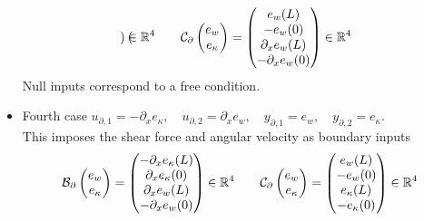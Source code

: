 \begin{itemize}
\begin{equation}
\begin{pmatrix}
	\end{pmatrix} \in \mathbb{R}^4 \qquad 
	\mathcal{C}_\partial \begin{pmatrix}
	e_w \\ e_\kappa \\ 
	\end{pmatrix} = \begin{pmatrix}
	e_w(L) \\ -e_w(0) \\  \partial_x e_w(L) \\ -\partial_x e_w(0)
	\end{pmatrix} \in \mathbb{R}^4
	\end{equation}
	 Null inputs correspond to a free condition.
	\item {Fourth case} ${u}_{\partial, 1} = -\partial_{x}e_\kappa , \quad {u}_{\partial, 2} = \partial_{x}e_w, \quad {y}_{\partial, 1} = e_w, \quad {y}_{\partial, 2} = e_\kappa$. \\
	This imposes the shear force and angular velocity as boundary inputs
	\begin{equation}
	\mathcal{B}_\partial \begin{pmatrix}
	e_w \\ e_\kappa \\
	\end{pmatrix} = \begin{pmatrix}
	-\partial_x e_\kappa(L) \\  \partial_x e_\kappa(0) \\ \partial_x e_w(L) \\ -\partial_x e_w(0)
	\end{pmatrix} \in \mathbb{R}^4 \qquad 
	\mathcal{C}_\partial \begin{pmatrix}
	e_w \\ e_\kappa \\ 
	\end{pmatrix} = \begin{pmatrix}
	e_w(L) \\ -e_w(0) \\ e_\kappa(L) \\ -e_\kappa(0) \\
	\end{pmatrix} \in \mathbb{R}^4
	\end{equation}
\end{itemize} 

